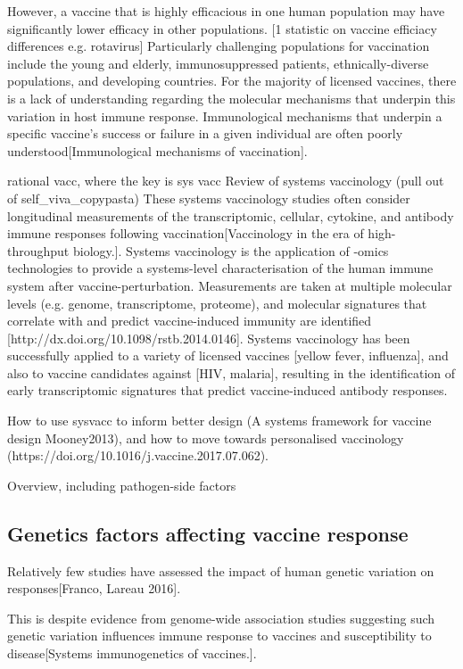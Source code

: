 However, a vaccine that is highly efficacious in one human population may have significantly lower efficacy in other populations.
[1 statistic on vaccine efficiacy differences e.g. rotavirus]
Particularly challenging populations for vaccination include the young and elderly, immunosuppressed patients, ethnically-diverse populations, and developing countries.
For the majority of licensed vaccines, there is a lack of understanding regarding the molecular mechanisms that underpin this variation in host immune response.
Immunological mechanisms that underpin a specific vaccine's success or failure in a given individual are often poorly understood[Immunological mechanisms of vaccination]. 

rational vacc, where the key is sys vacc
Review of systems vaccinology (pull out of self\_viva\_copypasta)
These systems vaccinology studies often consider longitudinal measurements of the transcriptomic, cellular, cytokine, and antibody immune responses following vaccination[Vaccinology in the era of high-throughput biology.].
Systems vaccinology is the application of -omics technologies to provide a systems-level characterisation of the human immune system after vaccine-perturbation.
Measurements are taken at multiple molecular levels (e.g. genome, transcriptome, proteome), and molecular signatures that correlate with and predict vaccine-induced immunity are identified [http://dx.doi.org/10.1098/rstb.2014.0146].
Systems vaccinology has been successfully applied to a variety of licensed vaccines [yellow fever, influenza], and also to vaccine candidates against [HIV, malaria], resulting in the identification of early transcriptomic signatures that predict vaccine-induced antibody responses.

How to use sysvacc to inform better design (A systems framework for vaccine design Mooney2013), and how to move towards personalised vaccinology (https://doi.org/10.1016/j.vaccine.2017.07.062).

Overview, including pathogen-side factors

\subsection{Genetics factors affecting vaccine response}

Relatively few studies have assessed the impact of human genetic variation on responses[Franco, Lareau 2016].

This is despite evidence from genome-wide association studies suggesting such genetic variation influences immune response to vaccines and susceptibility to disease[Systems immunogenetics of vaccines.].

